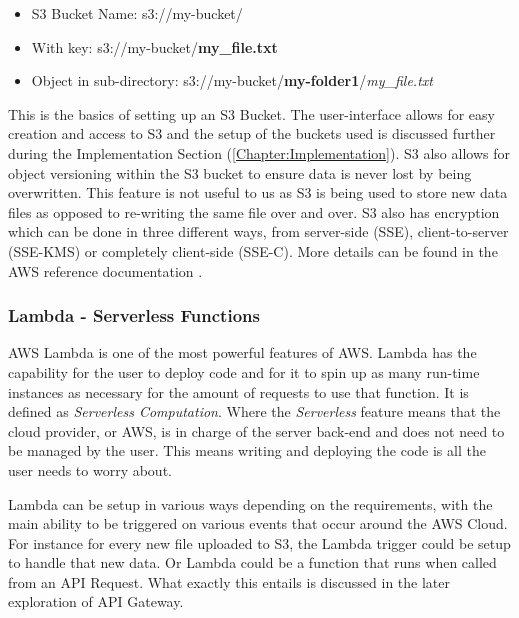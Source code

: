 \begin{itemize}
    \item S3 Bucket Name: s3://my-bucket/
    \item With key: s3://my-bucket/\textbf{my\_file.txt}
    \item Object in sub-directory: s3://my-bucket/\textbf{my-folder1}/\textit{my\_file.txt}
\end{itemize}

This is the basics of setting up an S3 Bucket. The user-interface allows for easy creation and access to S3 and the setup of the buckets used is discussed further during the Implementation Section (\ref{Chapter:Implementation}). S3 also allows for object versioning within the S3 bucket to ensure data is never lost by being overwritten. This feature is not useful to us as S3 is being used to store new data files as opposed to re-writing the same file over and over. S3 also has encryption which can be done in three different ways, from server-side (SSE), client-to-server (SSE-KMS) or completely client-side (SSE-C). More details can be found in the AWS reference documentation \cite{ch1_2_s3_encryption}. 

\subsubsection{Lambda - Serverless Functions}
AWS Lambda is one of the most powerful features of AWS. Lambda has the capability for the user to deploy code and for it to spin up as many run-time instances as necessary for the amount of requests to use that function. It is defined as \textit{Serverless Computation}. Where the \textit{Serverless} feature means that the cloud provider, or AWS, is in charge of the server back-end and does not need to be managed by the user. This means writing and deploying the code is all the user needs to worry about. 

Lambda can be setup in various ways depending on the requirements, with the main ability to be triggered on various events that occur around the AWS Cloud. For instance for every new file uploaded to S3, the Lambda trigger could be setup to handle that new data. Or Lambda could be a function that runs when called from an API Request. What exactly this entails is discussed in the later exploration of API Gateway. 

